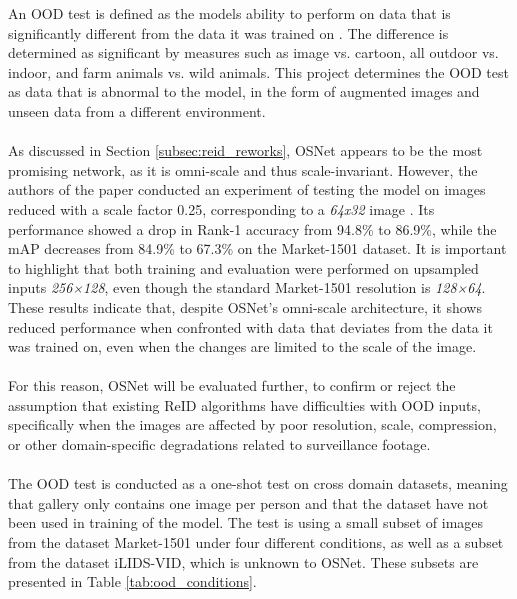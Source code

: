 An \acf{OOD} test is defined as the models ability to perform on data that is significantly different from the data it was trained on \cite{OOD}. The difference is determined as significant by measures such as image vs. cartoon, all outdoor vs. indoor, and farm animals vs. wild animals. This project determines the \acs{OOD} test as data that is abnormal to the model, in the form of augmented images and unseen data from a different environment.
\\\\
As discussed in Section \ref{subsec:reid_reworks}, \acs{OSNet} appears to be the most promising network, as it is omni-scale and thus scale-invariant. However, the authors of the paper conducted an experiment of testing the model on images reduced with a scale factor 0.25, corresponding to a \textit{64x32} image \cite{OSNet}. Its performance showed a drop in Rank-1 accuracy from 94.8\% to 86.9\%, while the \acs{mAP} decreases from 84.9\% to 67.3\% on the Market-1501 dataset. It is important to highlight that both training and evaluation were performed on upsampled inputs \textit{256×128}, even though the standard Market-1501 resolution is \textit{128×64}. These results indicate that, despite \acs{OSNet}'s omni-scale architecture, it shows reduced performance when confronted with data that deviates from the data it was trained on, even when the changes are limited to the scale of the image.
\\\\
For this reason, \acs{OSNet} will be evaluated further, to confirm or reject the assumption that existing \acs{ReID} algorithms have difficulties with \acf{OOD} inputs, specifically when the images are affected by poor resolution, scale, compression, or other domain-specific degradations related to surveillance footage. 
\\\\ 
The \acs{OOD} test is conducted as a one-shot test on cross domain datasets, meaning that gallery only contains one image per person and that the dataset have not been used in training of the model. The test is using a small subset of images from the dataset Market-1501 under four different conditions, as well as a subset from the dataset \acf{iLIDS-VID}, which is unknown to \acs{OSNet}. These subsets are presented in Table \ref{tab:ood_conditions}.

